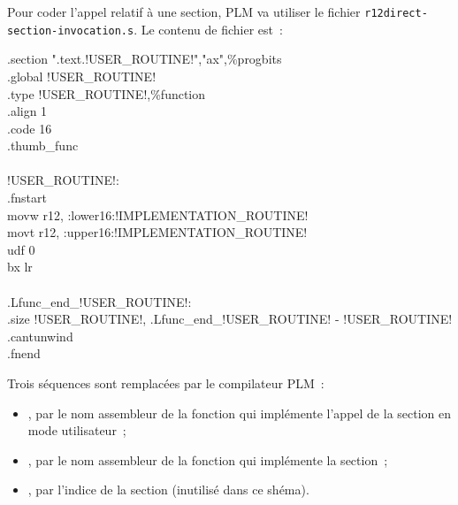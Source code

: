 Pour coder l'appel relatif à une section, PLM va utiliser le fichier \texttt{r12direct-section-invocation.s}. Le contenu de fichier est~:
\begin{SHELL}\small
\hspace*{1.2em}.section  ".text.!USER\_ROUTINE!","ax",\%progbits\\
\hspace*{1.2em}.global !USER\_ROUTINE!\\
\hspace*{1.2em}.type  !USER\_ROUTINE!,\%function\\
\hspace*{1.2em}.align  1\\
\hspace*{1.2em}.code  16\\
\hspace*{1.2em}.thumb\_func\\
\\
!USER\_ROUTINE!:\\
\hspace*{1.2em}.fnstart\\
\hspace*{1.2em}movw  r12, :lower16:!IMPLEMENTATION\_ROUTINE!\\
\hspace*{1.2em}movt  r12, :upper16:!IMPLEMENTATION\_ROUTINE!\\
\hspace*{1.2em}udf 0\\
\hspace*{1.2em}bx  lr\\
\\
.Lfunc\_end\_!USER\_ROUTINE!:\\
\hspace*{1.2em}.size  !USER\_ROUTINE!, .Lfunc\_end\_!USER\_ROUTINE! - !USER\_ROUTINE!\\
\hspace*{1.2em}.cantunwind\\
\hspace*{1.2em}.fnend
\end{SHELL}

Trois séquences sont remplacées par le compilateur PLM~:
\begin{itemize}
\item {}, par le nom assembleur de la fonction qui implémente l'appel de la section en mode utilisateur~;
\item {}, par le nom assembleur de la fonction qui implémente la section~;
\item {}, par l'indice de la section (inutilisé dans ce shéma).
\end{itemize}

